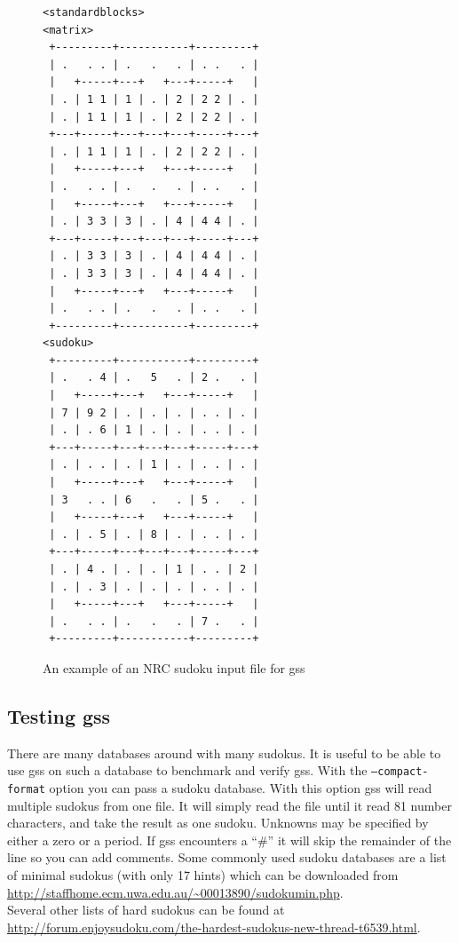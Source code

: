 \documentclass[12pt]{article}
\begin{document}
\begin{figure}
\begin{verbatim}
<standardblocks>
<matrix>
 +---------+-----------+---------+ 
 | .   . . | .   .   . | . .   . |
 |   +-----+---+   +---+-----+   |       
 | . | 1 1 | 1 | . | 2 | 2 2 | . |
 | . | 1 1 | 1 | . | 2 | 2 2 | . |
 +---+-----+---+---+---+-----+---+ 
 | . | 1 1 | 1 | . | 2 | 2 2 | . |
 |   +-----+---+   +---+-----+   |   
 | .   . . | .   .   . | . .   . |
 |   +-----+---+   +---+-----+   |       
 | . | 3 3 | 3 | . | 4 | 4 4 | . |
 +---+-----+---+---+---+-----+---+ 
 | . | 3 3 | 3 | . | 4 | 4 4 | . |
 | . | 3 3 | 3 | . | 4 | 4 4 | . |
 |   +-----+---+   +---+-----+   |  
 | .   . . | .   .   . | . .   . |
 +---------+-----------+---------+
<sudoku>
 +---------+-----------+---------+ 
 | .   . 4 | .   5   . | 2 .   . |
 |   +-----+---+   +---+-----+   |       
 | 7 | 9 2 | . | . | . | . . | . |
 | . | . 6 | 1 | . | . | . . | . |
 +---+-----+---+---+---+-----+---+ 
 | . | . . | . | 1 | . | . . | . |
 |   +-----+---+   +---+-----+   |   
 | 3   . . | 6   .   . | 5 .   . |
 |   +-----+---+   +---+-----+   |       
 | . | . 5 | . | 8 | . | . . | . |
 +---+-----+---+---+---+-----+---+ 
 | . | 4 . | . | . | 1 | . . | 2 |
 | . | . 3 | . | . | . | . . | . |
 |   +-----+---+   +---+-----+   |  
 | .   . . | .   .   . | 7 .   . |
 +---------+-----------+---------+
\end{verbatim}
\caption{\label{nrcsudoku}An example of an NRC sudoku input file for gss}
\end{figure}

\subsection{Testing gss}
There are many databases around with many sudokus. It is useful to be able to use gss on such a database to benchmark and verify gss. With the \texttt{--compact-format} option you can pass a sudoku database. With this option gss will read multiple sudokus from one file. It will simply read the file until it read 81 number characters, and take the result as one sudoku. Unknowns may be specified by either a zero or a period. If gss encounters a ``\#'' it will skip the remainder of the line so you can add comments. Some commonly used sudoku databases are a list of minimal sudokus (with only 17 hints) which can be downloaded from \\
\url{http://staffhome.ecm.uwa.edu.au/~00013890/sudokumin.php}.\\
Several other lists of hard sudokus can be found at\\
\url{http://forum.enjoysudoku.com/the-hardest-sudokus-new-thread-t6539.html}.
\end{document}
